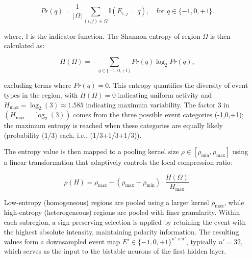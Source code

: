 \begin{equation}
Pr(q) = \frac{1}{|\Omega|} \sum_{(i,j) \in \Omega} \mathbb{I}(E_{i,j} = q), \quad \text{for } q \in \{-1, 0, +1\}.
\end{equation}

\noindent where, \(\mathbb{I}\) is the indicator function. The Shannon entropy of region \(\Omega\) is then calculated as:

\begin{equation}
H(\Omega) = -\sum_{q \in \{-1, 0, +1\}} Pr(q) \log_2 Pr(q),
\end{equation}

\noindent excluding terms where \( Pr(q) = 0 \). This entropy quantifies the diversity of event types in the region, with \( H(\Omega) = 0 \) indicating uniform activity and \( H_{\max} = \log_2(3) \approx 1.585 \) indicating maximum variability. The factor 3 in \((H_{\max}=\log_2(3))\) comes from the three possible event categories (-1,0,+1); the maximum entropy is reached when these categories are equally likely (probability (1/3) each, i.e., (1/3+1/3+1/3)).

The entropy value is then mapped to a pooling kernel size \( \rho \in [\rho_{\min}, \rho_{\max}] \) using a linear transformation that adaptively controls the local compression ratio:

\begin{equation}
\rho(H) = \rho_{\max} - (\rho_{\max} - \rho_{\min}) \cdot \frac{H(\Omega)}{H_{\max}}.
\end{equation}

Low-entropy (homogeneous) regions are pooled using a larger kernel \( \rho_{\max} \), while high-entropy (heterogeneous) regions are pooled with finer granularity. Within each subregion, a sign-preserving selection is applied by retaining the event with the highest absolute intensity, maintaining polarity information. The resulting values form a downsampled event map \( E' \in \{-1, 0, +1\}^{n' \times n'} \), typically \(n' = 32\), which serves as the input to the bistable neurons of the first hidden layer.



